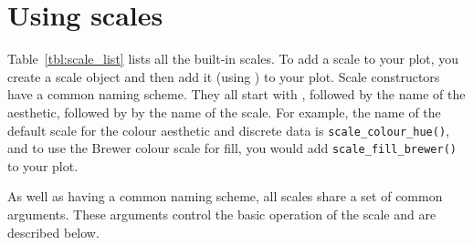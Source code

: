\section{Using scales}
\label{sec:scale-usage}

Table~\ref{tbl:scale_list} lists all the built-in scales.  To add a scale to your plot, you create a scale object and then add it (using \code{+}) to your plot. Scale constructors have a common naming scheme.  They all start with , followed by the name of the aesthetic, followed by by the name of the scale. For example, the name of the default scale for the colour aesthetic and discrete data is {\tt scale\_colour\_hue()}, and to use the Brewer colour scale for fill, you would add {\tt scale\_fill\_brewer()} to your plot.

%

As well as having a common naming scheme, all scales share a set of common arguments.  These arguments control the basic operation of the scale and are described below.

